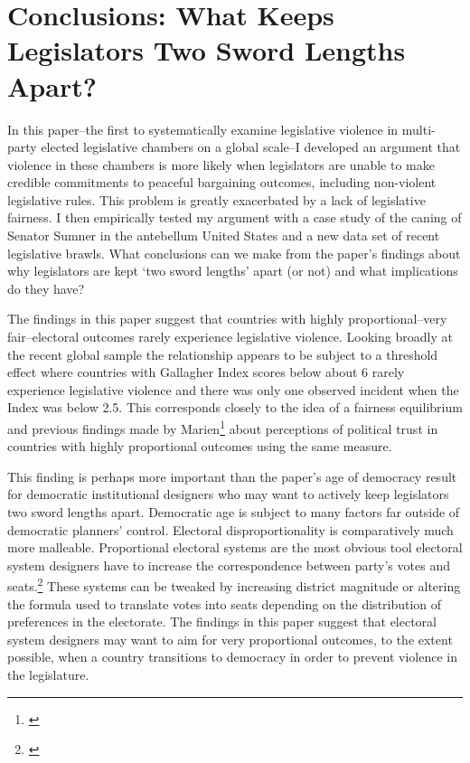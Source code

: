 \documentclass[a4paper]{article}\usepackage[]{graphicx}\usepackage[]{color}
\begin{document}
\section*{Conclusions: What Keeps Legislators Two Sword Lengths Apart?}

In this paper--the first to systematically examine legislative violence in multi-party elected legislative chambers on a global scale--I developed an argument that violence in these chambers is more likely when legislators are unable to make credible commitments to peaceful bargaining outcomes, including non-violent legislative rules. This problem is greatly exacerbated by a lack of legislative fairness. I then empirically tested my argument with a case study of the caning of Senator Sumner in the antebellum United States and a new data set of recent legislative brawls. What conclusions can we make from the paper's findings about why legislators are kept `two sword lengths' apart (or not) and what implications do they have?

The findings in this paper suggest that countries with highly proportional--very fair--electoral outcomes rarely experience legislative violence. Looking broadly at the recent global sample the relationship appears to be subject to a threshold effect where countries with Gallagher Index scores below about 6 rarely experience legislative violence and there was only one observed incident when the Index was below 2.5. This corresponds closely to the idea of a fairness equilibrium and previous findings made by Marien\footnote{\citealt{Marien2011}} about perceptions of political trust in countries with highly proportional outcomes using the same measure. 

This finding is perhaps more important than the paper's age of democracy result for democratic institutional designers who may want to actively keep legislators two sword lengths apart. Democratic age is subject to many factors far outside of democratic planners' control. Electoral disproportionality is comparatively much more malleable. Proportional electoral systems are the most obvious tool electoral system designers have to increase the correspondence between party's votes and seats.\footnote{\citealt{Carey2011}} These systems can be tweaked by increasing district magnitude or altering the formula used to translate votes into seats depending on the distribution of preferences in the electorate. The findings in this paper suggest that electoral system designers may want to aim for very proportional outcomes, to the extent possible, when a country transitions to democracy in order to prevent violence in the legislature. 
\end{document}
